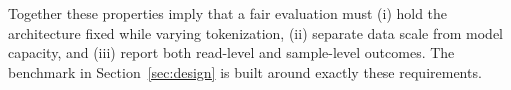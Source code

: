 \medskip
\noindent Together these properties imply that a fair evaluation must (i) hold
the architecture fixed while varying tokenization, (ii) separate data scale
from model capacity, and (iii) report both read-level and sample-level
outcomes. The benchmark in Section~\ref{sec:design} is built around exactly
these requirements.
